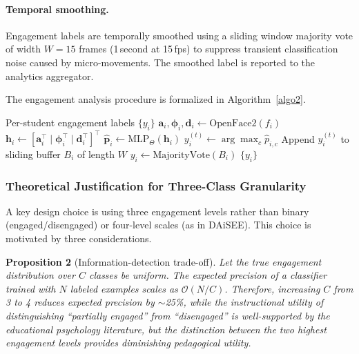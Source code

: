 \documentclass[preprint,12pt]{elsarticle}
\begin{document}
\paragraph{Temporal smoothing.}
Engagement labels are temporally smoothed using a sliding window majority vote of width $W=15$ frames (1\,second at 15\,fps) to suppress transient classification noise caused by micro-movements. The smoothed label is reported to the analytics aggregator.

The engagement analysis procedure is formalized in Algorithm~\ref{algo2}.

\begin{algorithm}[H]
    \caption{AU-Pose-Gaze Fusion Engagement Analysis}
    \begin{algorithmic}[1]
         Per-student engagement labels $\{y_i\}$
            \State $\mathbf{a}_i, \boldsymbol{\phi}_i, \mathbf{d}_i \gets \text{OpenFace2}(f_i)$ 
            \State $\mathbf{h}_i \gets [\mathbf{a}_i^\top \mid \boldsymbol{\phi}_i^\top \mid \mathbf{d}_i^\top]^\top$
            \State $\hat{\mathbf{p}}_i \gets \text{MLP}_\Theta(\mathbf{h}_i)$ 
            \State $y_i^{(t)} \gets \arg\max_c \hat{p}_{i,c}$
            \State Append $y_i^{(t)}$ to sliding buffer $B_i$ of length $W$
            \State $y_i \gets \text{MajorityVote}(B_i)$ 
        \EndFor
        \State \Return $\{y_i\}$
        \EndProcedure
    \end{algorithmic}
    \label{algo2}
\end{algorithm}

\subsubsection{Theoretical Justification for Three-Class Granularity}

A key design choice is using three engagement levels rather than binary (engaged/disengaged) or four-level scales (as in DAiSEE). This choice is motivated by three considerations.

\textbf{Proposition 2} (Information-detection trade-off). \textit{Let the true engagement distribution over $C$ classes be uniform. The expected precision of a classifier trained with $N$ labeled examples scales as $\mathcal{O}(N/C)$. Therefore, increasing $C$ from 3 to 4 reduces expected precision by $\sim$25\%, while the instructional utility of distinguishing ``partially engaged'' from ``disengaged'' is well-supported by the educational psychology literature, but the distinction between the two highest engagement levels provides diminishing pedagogical utility.}
\end{document}
